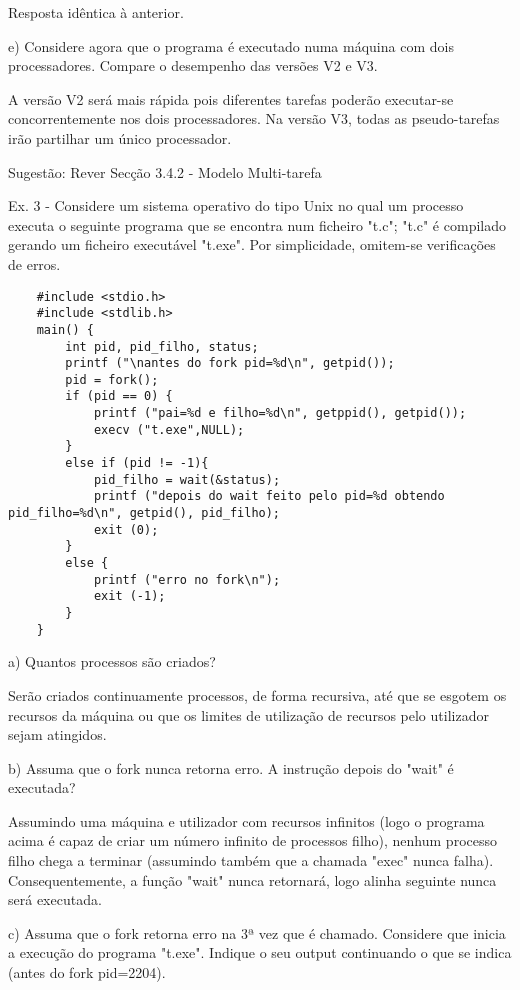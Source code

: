 \documentclass[11pt]{article}
\begin{document}
Resposta idêntica à anterior.

e) Considere agora que o programa é executado numa máquina com dois processadores. Compare o desempenho das versões V2 e V3.

A versão V2 será mais rápida pois diferentes tarefas poderão executar-se concorrentemente nos dois processadores. Na versão V3, todas as pseudo-tarefas irão partilhar um único processador.

Sugestão: Rever Secção 3.4.2 - Modelo Multi-tarefa


Ex. 3 - Considere um sistema operativo do tipo Unix no qual um processo executa o seguinte programa que se encontra num ficheiro "t.c"; "t.c" é compilado gerando um ficheiro executável "t.exe". Por simplicidade, omitem-se verificações de erros.

\begin{lstlisting}
    #include <stdio.h>
    #include <stdlib.h>
    main() {
        int pid, pid_filho, status;
        printf ("\nantes do fork pid=%d\n", getpid());
        pid = fork();
        if (pid == 0) {
            printf ("pai=%d e filho=%d\n", getppid(), getpid());
            execv ("t.exe",NULL);
        }
        else if (pid != -1){
            pid_filho = wait(&status);
            printf ("depois do wait feito pelo pid=%d obtendo pid_filho=%d\n", getpid(), pid_filho);
            exit (0);
        }
        else {
            printf ("erro no fork\n");
            exit (-1);
        }
    }
\end{lstlisting}

a) Quantos processos são criados?

Serão criados continuamente processos, de forma recursiva, até que se esgotem os recursos da máquina ou que os limites de utilização de recursos pelo utilizador sejam atingidos.

b) Assuma que o fork nunca retorna erro. A instrução depois do "wait" é executada?

Assumindo uma máquina e utilizador com recursos infinitos (logo o programa acima é capaz de criar um número infinito de processos filho), nenhum processo filho chega a terminar (assumindo também que a chamada "exec" nunca falha). Consequentemente, a função "wait" nunca retornará, logo alinha seguinte nunca será executada.

c) Assuma que o fork retorna erro na 3ª vez que é chamado. Considere que inicia a execução do programa "t.exe". Indique o seu output continuando o que se indica (antes do fork pid=2204).
\end{document}

